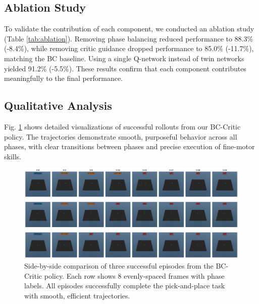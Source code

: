\documentclass[conference]{IEEEtran}
\begin{document}


\subsection{Ablation Study}
To validate the contribution of each component, we conducted an ablation study (Table \ref{tab:ablation}). Removing phase balancing reduced performance to 88.3\% (-8.4\%), while removing critic guidance dropped performance to 85.0\% (-11.7\%), matching the BC baseline. Using a single Q-network instead of twin networks yielded 91.2\% (-5.5\%). These results confirm that each component contributes meaningfully to the final performance.



\subsection{Qualitative Analysis}
Fig. \ref{fig:rollouts} shows detailed visualizations of successful rollouts from our BC-Critic policy. The trajectories demonstrate smooth, purposeful behavior across all phases, with clear transitions between phases and precise execution of fine-motor skills.

\begin{figure}[t]
\centering
\includegraphics[width=\columnwidth]{rollouts/rollout_comparison.png}
\caption{Side-by-side comparison of three successful episodes from the BC-Critic policy. Each row shows 8 evenly-spaced frames with phase labels. All episodes successfully complete the pick-and-place task with smooth, efficient trajectories.}
\label{fig:rollouts}
\end{figure}
\end{document}
